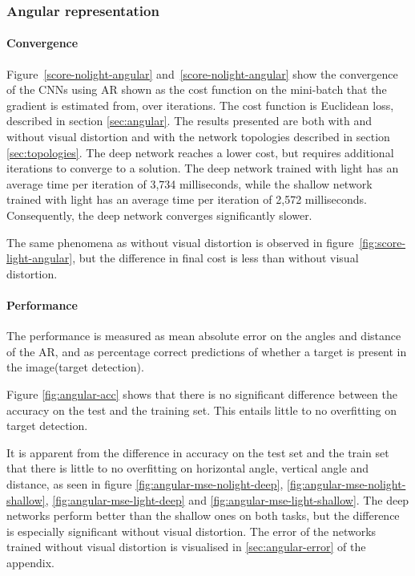 

\subsubsection{Angular representation}
\paragraph{Convergence}
Figure~\ref{score-nolight-angular} and~\ref{score-nolight-angular} show the convergence of the CNNs using AR shown as the cost function on the mini-batch that the gradient is estimated from, over iterations. The cost function is Euclidean loss, described in section \ref{sec:angular}.
The results presented are both with and without visual distortion and with the network topologies described in section \ref{sec:topologies}. The deep network reaches a lower cost, but requires additional iterations to converge to a solution. The deep network trained with light has an average time per iteration of 3,734 milliseconds, while the shallow network trained with light has an average time per iteration of 2,572 milliseconds. Consequently, the deep network converges significantly slower.

The same phenomena as without visual distortion is observed in figure~\ref{fig:score-light-angular}, but the difference in final cost is less than without visual distortion.





\paragraph{Performance}
\label{sec:results-angular-representation}
The performance is measured as mean absolute error on the angles and distance of the AR, and as percentage correct predictions of whether a target is present in the image(target detection).

Figure \ref{fig:angular-acc} shows that there is no significant difference between the accuracy on the test and the training set. This entails little to no overfitting on target detection.

It is apparent from the difference in accuracy on the test set and the train set that there is little to no overfitting on horizontal angle, vertical angle and distance, as seen in figure \ref{fig:angular-mse-nolight-deep}, \ref{fig:angular-mse-nolight-shallow}, \ref{fig:angular-mse-light-deep} and \ref{fig:angular-mse-light-shallow}. The deep networks perform better than the shallow ones on both tasks, but the difference is especially significant without visual distortion. The error of the networks trained without visual distortion is visualised in \ref{sec:angular-error} of the appendix.


